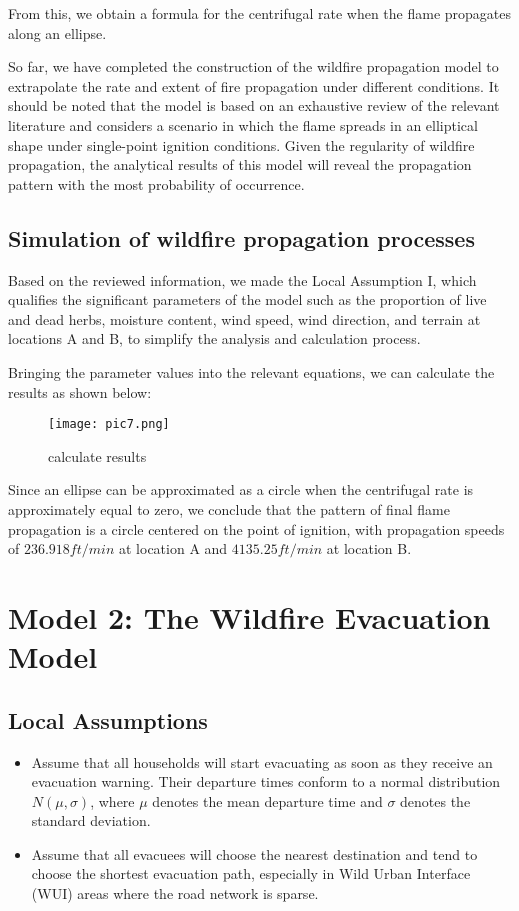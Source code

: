 \documentclass[12pt]{article}  %
\begin{document}
From this, we obtain a formula for the centrifugal rate when the flame propagates along an ellipse.

So far, we have completed the construction of the wildfire propagation model to extrapolate the rate and extent of fire propagation under different conditions. It should be noted that the model is based on an exhaustive review of the relevant literature and considers a scenario in which the flame spreads in an elliptical shape under single-point ignition conditions. Given the regularity of wildfire propagation, the analytical results of this model will reveal the propagation pattern with the most probability of occurrence.

\subsection{Simulation of wildfire propagation processes}
Based on the reviewed information, we made the Local Assumption I, which qualifies the significant parameters of the model such as the proportion of live and dead herbs, moisture content, wind speed, wind direction, and terrain at locations A and B, to simplify the analysis and calculation process.

Bringing the parameter values into the relevant equations, we can calculate the results as shown below:
\begin{figure}[H]  %
	\centering  %
	\texttt{[image: pic7.png]} %
	\caption{calculate results} %
\end{figure}


Since an ellipse can be approximated as a circle when the centrifugal rate is approximately equal to zero, we conclude that the pattern of final flame propagation is a circle centered on the point of ignition, with propagation speeds of $236.918 ft/min$ at location A and $4135.25 ft/min$ at location B.

\section{Model 2: The Wildfire Evacuation Model}

\subsection{Local Assumptions}
\begin{itemize}
	\setlength{\parsep}{0ex} 
	\setlength{\topsep}{2ex} 
	\setlength{\itemsep}{1ex} 
	\item Assume that all households will start evacuating as soon as they receive an evacuation warning. Their departure times conform to a normal distribution \( N(\mu, \sigma) \), where \( \mu \) denotes the mean departure time and \( \sigma \) denotes the standard deviation.
	
	\item Assume that all evacuees will choose the nearest destination and tend to choose the shortest evacuation path, especially in Wild Urban Interface (WUI) areas where the road network is sparse.
\end{itemize}
\end{document}
